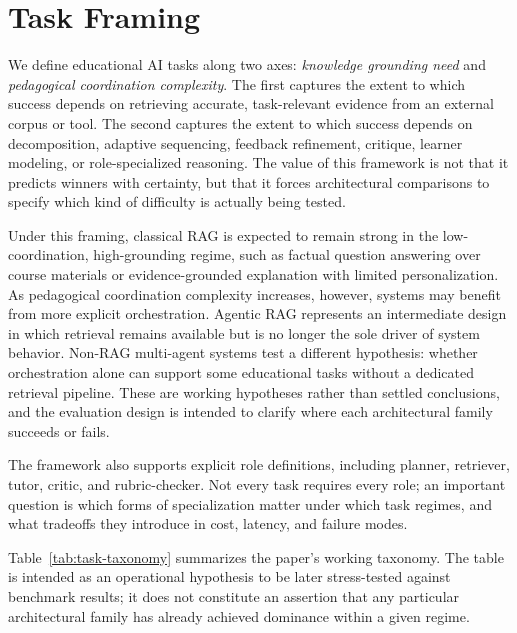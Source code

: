 \section{Task Framing}

We define educational AI tasks along two axes: \emph{knowledge grounding need} and \emph{pedagogical coordination complexity}. The first captures the extent to which success depends on retrieving accurate, task-relevant evidence from an external corpus or tool. The second captures the extent to which success depends on decomposition, adaptive sequencing, feedback refinement, critique, learner modeling, or role-specialized reasoning. The value of this framework is not that it predicts winners with certainty, but that it forces architectural comparisons to specify which kind of difficulty is actually being tested.

Under this framing, classical RAG is expected to remain strong in the low-coordination, high-grounding regime, such as factual question answering over course materials or evidence-grounded explanation with limited personalization. As pedagogical coordination complexity increases, however, systems may benefit from more explicit orchestration. Agentic RAG represents an intermediate design in which retrieval remains available but is no longer the sole driver of system behavior. Non-RAG multi-agent systems test a different hypothesis: whether orchestration alone can support some educational tasks without a dedicated retrieval pipeline. These are working hypotheses rather than settled conclusions, and the evaluation design is intended to clarify where each architectural family succeeds or fails.

The framework also supports explicit role definitions, including planner, retriever, tutor, critic, and rubric-checker. Not every task requires every role; an important question is which forms of specialization matter under which task regimes, and what tradeoffs they introduce in cost, latency, and failure modes.

Table~\ref{tab:task-taxonomy} summarizes the paper's working taxonomy. The table is intended as an operational hypothesis to be later stress-tested against benchmark results; it does not constitute an assertion that any particular architectural family has already achieved dominance within a given regime.

